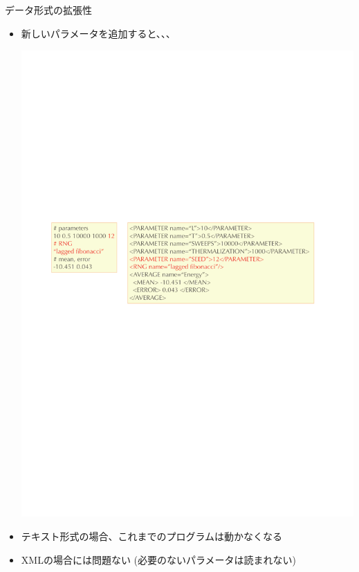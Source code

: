 \subsection*{\redm\whitem\greenb}
\begin{frame}{データ形式の拡張性}
  \begin{itemize}
  \item 新しいパラメータを追加すると、、、
  \begin{center}
    \includegraphics[width=.8\textwidth]{xml4.pdf}
  \end{center}
  \item テキスト形式の場合、これまでのプログラムは動かなくなる
  \item XMLの場合には問題ない (必要のないパラメータは読まれない)
  \end{itemize}
\end{frame}

